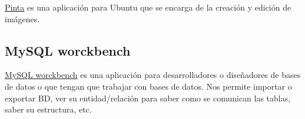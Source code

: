 \href{https://pinta-project.com/pintaproject/pinta/}{Pinta} es una aplicación para Ubuntu que se encarga de la creación y edición de imágenes.

\subsection{MySQL worckbench}\label{pinta}

\href{https://pinta-project.com/pintaproject/pinta/}{MySQL worckbench} es una aplicación para desarrolladores o diseñadores de bases de datos o que tengan que trabajar con bases de datos. Nos permite importar o exportar BD, ver su entidad/relación para saber como se comunican las tablas, saber su estructura, etc. \cite{web:worckbench}

